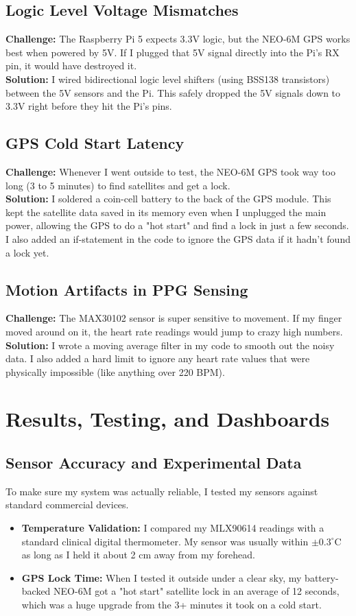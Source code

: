 \documentclass[12pt,a4paper,oneside]{report}
\begin{document}
\section{Logic Level Voltage Mismatches}
\textbf{Challenge:} The Raspberry Pi 5 expects 3.3V logic, but the NEO-6M GPS works best when powered by 5V. If I plugged that 5V signal directly into the Pi's RX pin, it would have destroyed it. \\
\textbf{Solution:} I wired bidirectional logic level shifters (using BSS138 transistors) between the 5V sensors and the Pi. This safely dropped the 5V signals down to 3.3V right before they hit the Pi's pins.

\section{GPS Cold Start Latency}
\textbf{Challenge:} Whenever I went outside to test, the NEO-6M GPS took way too long (3 to 5 minutes) to find satellites and get a lock. \\
\textbf{Solution:} I soldered a coin-cell battery to the back of the GPS module. This kept the satellite data saved in its memory even when I unplugged the main power, allowing the GPS to do a "hot start" and find a lock in just a few seconds. I also added an if-statement in the code to ignore the GPS data if it hadn't found a lock yet.

\section{Motion Artifacts in PPG Sensing}
\textbf{Challenge:} The MAX30102 sensor is super sensitive to movement. If my finger moved around on it, the heart rate readings would jump to crazy high numbers. \\
\textbf{Solution:} I wrote a moving average filter in my code to smooth out the noisy data. I also added a hard limit to ignore any heart rate values that were physically impossible (like anything over 220 BPM).


\chapter{Results, Testing, and Dashboards}

\section{Sensor Accuracy and Experimental Data}
To make sure my system was actually reliable, I tested my sensors against standard commercial devices. 
\begin{itemize}
    \item \textbf{Temperature Validation:} I compared my MLX90614 readings with a standard clinical digital thermometer. My sensor was usually within $\pm 0.3^\circ$C as long as I held it about 2 cm away from my forehead.
    \item \textbf{GPS Lock Time:} When I tested it outside under a clear sky, my battery-backed NEO-6M got a "hot start" satellite lock in an average of 12 seconds, which was a huge upgrade from the 3+ minutes it took on a cold start.
\end{itemize}
\end{document}
